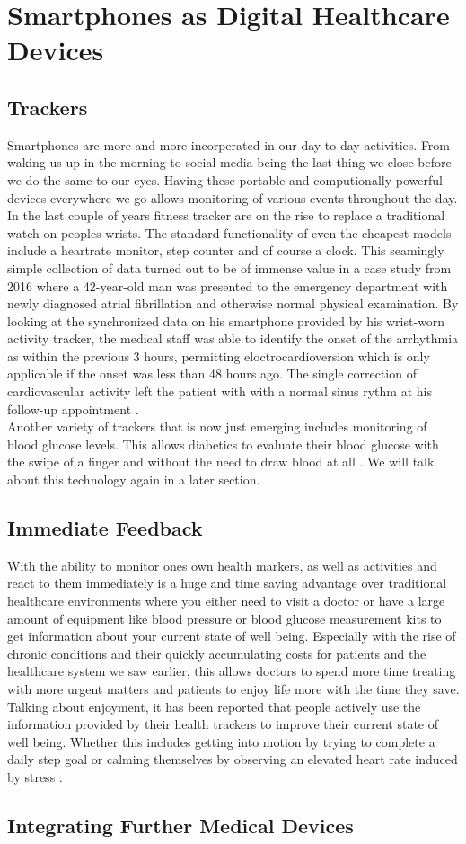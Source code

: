 \section{Smartphones as Digital Healthcare Devices}
\subsection{Trackers}
Smartphones are more and more incorperated in our day to day activities. From waking us up in the morning to social media being the last thing we close before we do the same to our eyes. Having these portable and computionally powerful devices everywhere we go allows monitoring of various events throughout the day. In the last couple of years fitness tracker are on the rise to replace a traditional watch on peoples wrists. The standard functionality of even the cheapest models include a heartrate monitor, step counter and of course a clock. This seamingly simple collection of data turned out to be of immense value in a case study from 2016 where a 42-year-old man was presented to the emergency department with newly diagnosed atrial fibrillation and otherwise normal physical examination. By looking at the synchronized data on his smartphone provided by his wrist-worn activity tracker, the medical staff was able to identify the onset of the arrhythmia as within the previous 3 hours, permitting eloctrocardioversion which is only applicable if the onset was less than 48 hours ago. The single correction of cardiovascular activity left the patient with with a normal sinus rythm at his follow-up appointment \cite{rudner2016interrogation}. \\
Another variety of trackers that is now just emerging includes monitoring of blood glucose levels. This allows diabetics to evaluate their blood glucose with the swipe of a finger and without the need to draw blood at all \cite{glucoseTracker}. We will talk about this technology again in a later section.
\subsection{Immediate Feedback}
With the ability to monitor ones own health markers, as well as activities and react to them immediately is a huge and time saving advantage over traditional healthcare environments where you either need to visit a doctor or have a large amount of equipment like blood pressure or blood glucose measurement kits to get information about your current state of well being. Especially with the rise of chronic conditions and their quickly accumulating costs for patients and the healthcare system we saw earlier, this allows doctors to spend more time treating with more urgent matters and patients to enjoy life more with the time they save. Talking about enjoyment, it has been reported that people actively use the information provided by their health trackers to improve their current state of well being. Whether this includes getting into motion by trying to complete a daily step goal \cite{rasche2015activity} or calming themselves by observing an elevated heart rate induced by stress \cite{mayya2015continuous}.
\subsection{Integrating Further Medical Devices}

